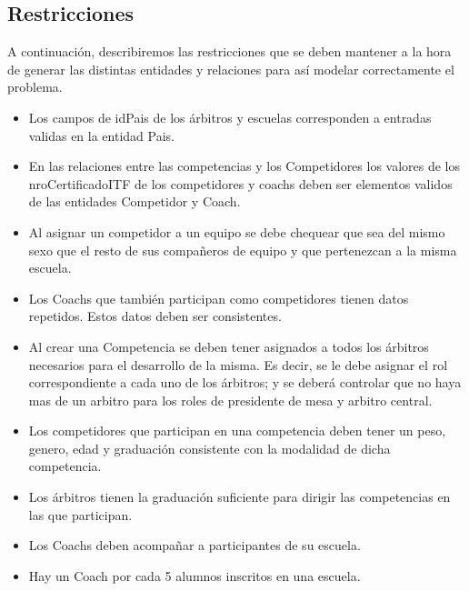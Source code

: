 \subsection{Restricciones}

A continuación, describiremos las restricciones que se deben mantener a la hora de generar las distintas entidades y relaciones para así modelar correctamente el problema.

\begin{itemize}
\item Los campos de idPais de los árbitros y escuelas corresponden a entradas validas en la entidad Pais.
\item En las relaciones entre las competencias y los Competidores los valores de los nroCertificadoITF de los competidores y coachs deben ser elementos validos de las entidades Competidor y Coach.
\item Al asignar un competidor a un equipo se debe chequear que sea del mismo sexo que el resto de sus compañeros de equipo y que pertenezcan a la misma escuela.
\item Los Coachs que también participan como competidores tienen datos repetidos. Estos datos deben ser consistentes.
\item Al crear una Competencia se deben tener asignados a todos los árbitros necesarios para el desarrollo de la misma. Es decir, se le debe asignar el rol correspondiente a cada uno de los árbitros; y se deberá controlar que no haya mas de un arbitro para los roles de presidente de mesa y arbitro central.
\item Los competidores que participan en una competencia deben tener un peso, genero, edad y graduación consistente con la modalidad de dicha competencia.
\item Los árbitros tienen la graduación suficiente para dirigir las competencias en las que participan.
\item Los Coachs deben acompañar a participantes de su escuela.
\item Hay un Coach por cada 5 alumnos inscritos en una escuela.
\end{itemize}
